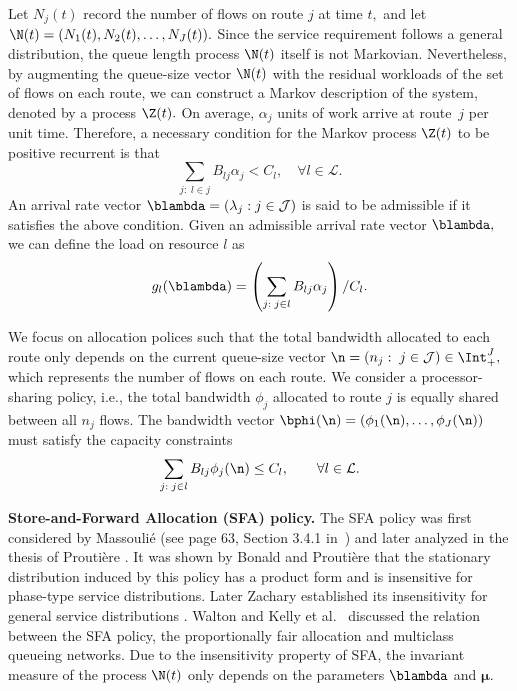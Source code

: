 Let $N_{j}(t)$ record the number of flows on route $j$ at time $t,$
and let $\N(t)=(N_{1}(t),N_{2}(t),\ldots,N_{J}(t)).$ Since the service
requirement follows a general distribution, the queue length process
$\N(t)$ itself is not Markovian. Nevertheless, by augmenting the
queue-size vector $\N(t)$ with the residual workloads of the set
of flows on each route, we can construct a Markov description of the
system, denoted by a process $\Z(t).$ On average, $\alpha_{j}$
units of work arrive at route~$j$ per unit time. Therefore, a necessary
condition for the Markov process $\Z(t)$ to be positive recurrent
is that 
\[
\sum_{j:\;l\in j}B_{lj}\alpha_{j}<C_{l},\quad\forall l\in\mathcal{L}.
\]
An arrival rate vector $\blambda=(\lambda_{j}:j\in\mathcal{J})$ is
said to be admissible if it satisfies the above condition. Given
an admissible arrival rate vector $\blambda,$ we can define the load
on resource $l$ as 
\[
g_{l}(\blambda)=\left(\sum_{j:\;j\in l}B_{lj}\alpha_{j}\right)/C_{l}.
\]

We focus on allocation polices such that the total bandwidth allocated
to each route only depends on the current queue-size vector $\n=(n_{j}:\;j\in\mathcal{J})\in\Int_{+}^{J},$ which represents
the number of flows on each route. We consider
a processor-sharing policy, i.e., the total bandwidth $\phi_{j}$
allocated to route $j$ is equally shared between all $n_{j}$ flows.
The bandwidth vector $\mathbf{\bphi}(\n)=(\phi_{1}(\n),\ldots,\phi_{J}(\n))$
must satisfy the capacity constraints
\begin{equation}
\sum_{j:\;j\in l}B_{lj}\phi_{j}(\n)\leq C_{l},\qquad\forall l\in\mathcal{L}.\label{eq:capacity_constraint}
\end{equation}

\smallskip
\noindent\textbf{Store-and-Forward Allocation (SFA) policy. }The SFA policy
was first considered by Massouli\'{e} (see page 63, Section 3.4.1 in~\cite{proutiere_thesis}) and
later analyzed in the thesis of Prouti\`{e}re \cite{proutiere_thesis}.
It was shown by Bonald and Prouti\`{e}re \cite{bonald2003insensitive}
that the stationary distribution induced by this policy has a product
form and is insensitive for phase-type service distributions. Later
Zachary established its insensitivity for general service distributions
\cite{zachary2007insensitivity}. Walton \cite{walton2009fairness}
and Kelly et al.\ \cite{kelly2009resource} discussed the relation
between the SFA policy, the proportionally fair allocation and multiclass
queueing networks. Due to the insensitivity property of SFA, the invariant
measure of the process $\N(t)$ only depends on the parameters $\blambda$
and $\boldsymbol{\mu}.$ 

